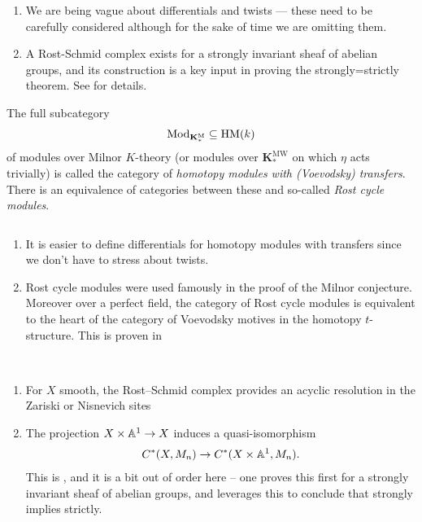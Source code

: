 \documentclass[11pt,openany]{book}
\providecommand{\HM}{\mathrm{HM}}
\providecommand{\KM}{\mathbf{K}^\mathrm{M}}
\providecommand{\KMW}{\mathbf{K}^\mathrm{MW}}
\begin{document}
\begin{remark} $\ $
\begin{enumerate}
    \item We are being vague about differentials and twists --- these need to be carefully considered although for the sake of time we are omitting them.
    \item A Rost-Schmid complex exists for a strongly invariant sheaf of abelian groups, and its construction is a key input in proving the strongly=strictly theorem. See \cite[\S6]{bachmannstrongly} for details.
\end{enumerate}
\end{remark}

\begin{definition} The full subcategory
\begin{align*}
    \Mod_{\KM_\ast} \subseteq \HM(k)
\end{align*}
of modules over Milnor $K$-theory (or modules over $\KMW_\ast$ on which $\eta$ acts trivially) is called the category of \textit{homotopy modules with (Voevodsky) transfers}. There is an equivalence of categories between these and so-called \textit{Rost cycle modules}.
\end{definition}

\begin{remark} $\ $
\begin{enumerate}
    \item It is easier to define differentials for homotopy modules with transfers since we don't have to stress about twists.
    \item Rost cycle modules were used famously in the proof of the Milnor conjecture. Moreover over a perfect field, the category of Rost cycle modules is equivalent to the heart of the category of Voevodsky motives in the homotopy $t$-structure. This is proven in \cite[Theorem 4.5]{Deglise-motifs-mixtes}
\end{enumerate}
\end{remark}

\begin{theorem} \,
\begin{enumerate}
    \item For $X$ smooth, the Rost--Schmid complex provides an acyclic resolution in the Zariski or Nisnevich sites
    \item The projection $X \times \mathbb{A}^1 \to X$ induces a quasi-isomorphism
    \begin{align*}
        C^\ast(X,M_n) \to C^\ast(X \times \mathbb{A}^1,M_n).
    \end{align*}
    This is \cite[5.38]{Morel}, and it is a bit out of order here -- one proves this first for a strongly invariant sheaf of abelian groups, and leverages this to conclude that strongly implies strictly.
\end{enumerate}

\end{theorem}
\end{document}
